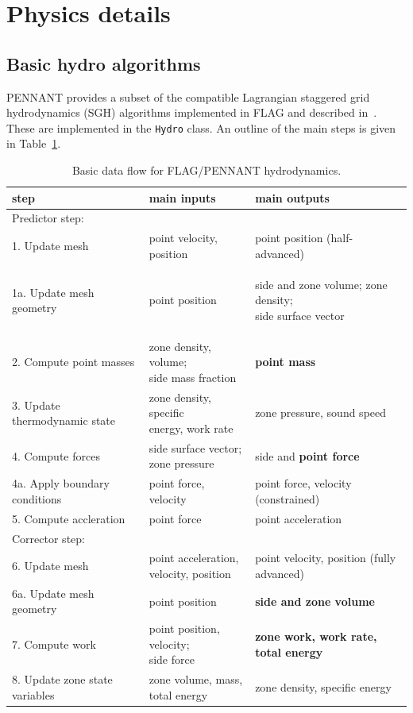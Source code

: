 \documentclass[11pt,letterpaper]{article} %
\begin{document}
\section{Physics details}

\subsection{Basic hydro algorithms}

PENNANT provides a subset of the compatible Lagrangian staggered grid
hydrodynamics (SGH) algorithms implemented in FLAG and described
in~\cite{hydro}.  These are implemented in the {\tt Hydro} class.
An outline of the main steps is given in Table~\ref{tbl:dataflow}.

\def\RR{\raggedright}

\begin{table}
\caption{Basic data flow for FLAG/PENNANT hydrodynamics.}
\label{tbl:dataflow}
\begin{tabular}{lp{108pt}p{180pt}}
    \hline
    step & main inputs & main outputs \\
    \hline
    Predictor step: \\
    1. Update mesh & point velocity, position & point position (half-advanced) \\
    1a. Update mesh geometry & point position & {\bf {\RR side and zone volume; zone density; \\ side surface vector } } \\
    2. Compute point masses & {\RR zone density, volume; \\ side mass fraction} & {\bf point mass} \\
    3. Update thermodynamic state & {\RR zone density, specific\\ energy, work rate} & zone pressure, sound speed \\
    4. Compute forces & {\RR side surface vector; \\ zone pressure} & side and {\bf point force} \\
    4a. Apply boundary conditions & point force, velocity & point force, velocity (constrained) \\
    5. Compute accleration & point force & point acceleration \\
    \hline
    Corrector step: \\
    6. Update mesh & {\RR point acceleration, \\ velocity, position} & point velocity, position (fully advanced) \\
    6a. Update mesh geometry & point position & {\bf side and zone volume} \\
    7. Compute work & {\RR point position, velocity; \\ side force} & {\bf zone work, work rate, total energy} \\
    8. Update zone state variables & {\RR zone volume, mass,\\ total energy} & zone density, specific energy \\
    \hline
\end{tabular}
\end{table}
\end{document}
